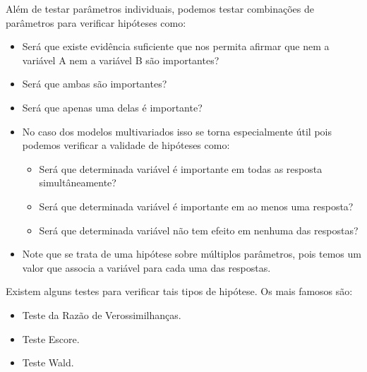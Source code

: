 \documentclass[10pt,
  aspectratio=169,
  serif,
  mathserif,
  professionalfont,
  compress,
  handout,
  ]{beamer}\usepackage[]{graphicx}\usepackage[]{color}
\begin{document}
\begin{frame}[c, allowframebreaks]

Além de testar parâmetros individuais, podemos testar combinações de parâmetros para verificar hipóteses como: 
  
  \begin{itemize}
    
    \item Será que existe evidência suficiente que nos permita afirmar que nem a variável A nem a variável B são importantes?
    
    \item Será que ambas são importantes?
    
    \item Será que apenas uma delas é importante?
    
  \end{itemize}

\end{frame}

\begin{frame}[c, allowframebreaks]

\begin{itemize}

  \item No caso dos modelos multivariados isso se torna especialmente útil pois podemos verificar a validade de hipóteses como: 
  
  \begin{itemize}
    \item Será que determinada variável é importante em todas as resposta simultâneamente?
    
    \item Será que determinada variável é importante em ao menos uma resposta?
    
    \item Será que determinada variável não tem efeito em nenhuma das respostas?
    
  \end{itemize}

  \item Note que se trata de uma hipótese sobre múltiplos parâmetros, pois temos um valor que associa a variável para cada uma das respostas.

\end{itemize}

\end{frame}

\begin{frame}[c, allowframebreaks]

Existem alguns testes para verificar tais tipos de hipótese. Os mais famosos são:

\begin{itemize}

  \item Teste da Razão de Verossimilhanças. 
  
  \item Teste Escore.
  
  \item Teste Wald.
  
\end{itemize}

\end{frame}
\end{document}

